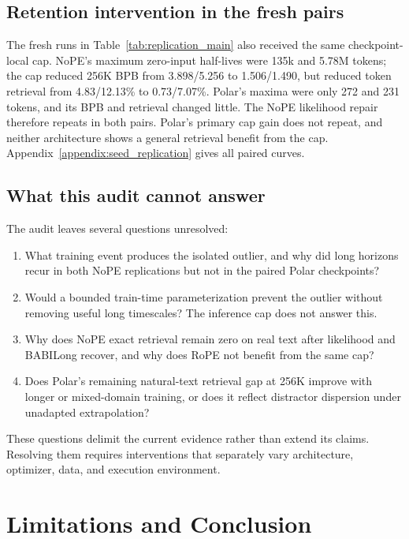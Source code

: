\documentclass{article}
\begin{document}
\subsection{Retention intervention in the fresh pairs}
The fresh runs in Table~\ref{tab:replication_main} also received the same checkpoint-local cap. NoPE's maximum zero-input half-lives were 135k and 5.78M tokens; the cap reduced 256K BPB from 3.898/5.256 to 1.506/1.490, but reduced token retrieval from 4.83/12.13\% to 0.73/7.07\%. Polar's maxima were only 272 and 231 tokens, and its BPB and retrieval changed little. The NoPE likelihood repair therefore repeats in both pairs. Polar's primary cap gain does not repeat, and neither architecture shows a general retrieval benefit from the cap. Appendix~\ref{appendix:seed_replication} gives all paired curves.

\subsection{What this audit cannot answer}
The audit leaves several questions unresolved:
\begin{enumerate}
\setlength{\itemsep}{0.15em}
\setlength{\parskip}{0pt}
\setlength{\parsep}{0pt}
\item What training event produces the isolated outlier, and why did long horizons recur in both NoPE replications but not in the paired Polar checkpoints?
\item Would a bounded train-time parameterization prevent the outlier without removing useful long timescales? The inference cap does not answer this.
\item Why does NoPE exact retrieval remain zero on real text after likelihood and BABILong recover, and why does RoPE not benefit from the same cap?
\item Does Polar's remaining natural-text retrieval gap at 256K improve with longer or mixed-domain training, or does it reflect distractor dispersion under unadapted extrapolation?
\end{enumerate}
These questions delimit the current evidence rather than extend its claims. Resolving them requires interventions that separately vary architecture, optimizer, data, and execution environment.

\section{Limitations and Conclusion}
\end{document}
